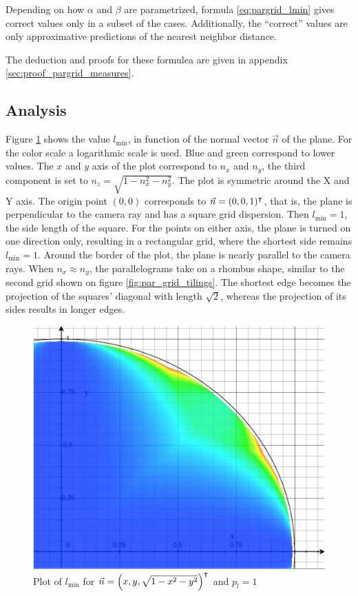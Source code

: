 Depending on how $\alpha$ and $\beta$ are parametrized, formula \ref{eq:pargrid_lmin} gives correct values only in a subset of the cases. Additionally, the ``correct'' values are only approximative predictions of the nearest neighbor distance.

The deduction and proofs for these formulea are given in appendix \ref{sec:proof_pargrid_measures}.



\subsection{Analysis}
Figure \ref{fig:lmin_plot} shows the value $l_{\text{min}}$, in function of the normal vector $\vec{n}$ of the plane. For the color scale a logarithmic scale is used. Blue and green correspond to lower values. The $x$ and $y$ axis of the plot correspond to $n_x$ and $n_y$, the third component is set to $n_z = \sqrt{1 - n^2_x - n^2_y}$. The plot is symmetric around the X and Y axis. The origin point $(0, 0)$ corresponds to $\vec{n} = (0, 0, 1)^\intercal$, that is, the plane is perpendicular to the camera ray and has a square grid dispersion. Then $l_{\text{min}} = 1$, the side length of the square. For the points on either axis, the plane is turned on one direction only, resulting in a rectangular grid, where the shortest side remains $l_{\text{min}} = 1$. Around the border of the plot, the plane is nearly parallel to the camera rays. When $n_x \approx n_y$, the parallelograms take on a rhombus shape, similar to the second grid shown on figure \ref{fig:par_grid_tilings}. The shortest edge becomes the projection of the squares' diagonal with length $\sqrt{2}$, whereas the projection of its sides results in longer edges.

\begin{figure}[h]
\centering
\includegraphics[width=.4\textwidth]{fig/lmin_plot.pdf}
\caption{Plot of $l_{\text{min}}$ for $\vec{n} = \left(x, y, \sqrt{1 - x^2 - y^2}\right)^\intercal$ and $p_l = 1$}
\label{fig:lmin_plot}
\end{figure}


